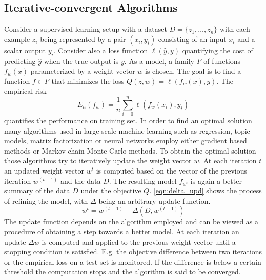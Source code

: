 \subsection{Iterative-convergent Algorithms}
\label{ss:ica}
Consider a supervised learning setup with a dataset $D = \{z_1,\ldots,z_n\}$ with each example $z_i$ being represented by a pair $(x_i,y_i)$ consisting of an input $x_i$ and a scalar output $y_i$.
Consider also a loss function $\ell(\hat{y},y)$ quantifying the cost of predicting $\hat{y}$ when the true output is $y$. As a model, a family $F$ of functions $f_w(x)$ parameterized by a weight vector $w$ is chosen.
The goal is to find a function $f \in F$ that minimizes the loss $Q(z, w) = \ell(f_w(x),y)$. The empirical risk
\begin{equation}
E_n(f_w) = \frac{1}{n}\sum_{i=0}^{n} \ell(f_w(x_i),y_i)
\label{eqn:emp_risk}
\end{equation}
quantifies the performance on training set.
In order to find an optimal solution many algorithms used in large scale machine learning such as regression, topic models, matrix factorization or neural networks employ either gradient based methods or Markov chain Monte Carlo methods.
To obtain the optimal solution those algorithms try to iteratively update the weight vector $w$. At each iteration $t$ an updated weight vector $w^{t}$ is computed based on the vector of the previous iteration $w^{(t-1)}$ and the data $D$. The resulting model $f_{w^{t}}$ is again a better summary of the data $D$ under the objective $Q$. \ref{eqn:delta_upd} shows the process of refining the model, with $\Delta$ being an arbitrary update function.
\begin{equation}
w^{t} = w^{(t-1)} + \Delta(D, w^{(t-1)})
\label{eqn:delta_upd}
\end{equation}
The update function depends on the algorithm employed and can be viewed as a procedure of obtaining a step towards a better model. At each iteration an update $\Delta w$ is computed and applied to the previous weight vector until a stopping condition is satisfied. E.g. the objective difference between two iterations or the empirical loss on a test set is monitored. If the difference is below a certain threshold the computation stops and the algorithm is said to be converged.


